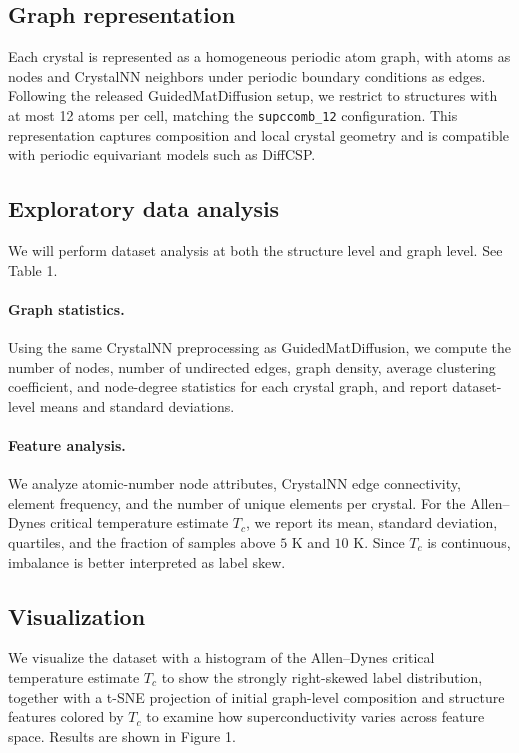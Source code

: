 \documentclass{article}
\begin{document}
\subsection{Graph representation}
Each crystal is represented as a homogeneous periodic atom graph, with atoms as nodes and CrystalNN neighbors under periodic boundary conditions as edges. Following the released GuidedMatDiffusion setup, we restrict to structures with at most 12 atoms per cell, matching the \texttt{supccomb\_12} configuration. This representation captures composition and local crystal geometry and is compatible with periodic equivariant models such as DiffCSP.

\subsection{Exploratory data analysis}
We will perform dataset analysis at both the structure level and graph level. See Table 1.

\paragraph{Graph statistics.}
Using the same CrystalNN preprocessing as GuidedMatDiffusion, we compute the number of nodes, number of undirected edges, graph density, average clustering coefficient, and node-degree statistics for each crystal graph, and report dataset-level means and standard deviations.

\paragraph{Feature analysis.}
We analyze atomic-number node attributes, CrystalNN edge connectivity, element frequency, and the number of unique elements per crystal. For the Allen--Dynes critical temperature estimate $T_c$, we report its mean, standard deviation, quartiles, and the fraction of samples above $5$ K and $10$ K. Since $T_c$ is continuous, imbalance is better interpreted as label skew.

\subsection{Visualization}
We visualize the dataset with a histogram of the Allen–Dynes critical temperature estimate $T_c$ to show the strongly right-skewed label distribution, together with a t-SNE projection of initial graph-level composition and structure features colored by $T_c$ to examine how superconductivity varies across feature space. Results are shown in Figure 1.
\end{document}

